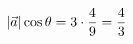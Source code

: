 \documentclass[preview]{standalone}
\begin{document}
\begin{align*}
\special{dvisvgm:raw <g id='unique000'>}|\vec a|\cos\theta=3\cdot\dfrac{4}{9}=\dfrac{4}{3}\special{dvisvgm:raw </g>}
\end{align*}
\end{document}
